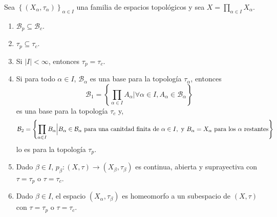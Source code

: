 \documentclass[12pt]{report}
\theoremstyle{largebreak}
\newcommand\cf[3]{\ensuremath{#1:#2\rightarrow#3}}
\begin{document}
    \begin{propo}
        Sea $\left\{(X_\alpha,\tau_\alpha) \right\}_{ \alpha\in I}$ una familia de espacios topológicos y sea $X=\prod_{\alpha\in I}X_\alpha$.
        \begin{enumerate}
            \item $\mathcal{B}_p\subseteq\mathcal{B}_c$.
            \item $\tau_p\subseteq\tau_c$.
            \item Si $|I|<\infty$, entonces $\tau_p=\tau_c$.
            \item Si para todo $\alpha\in I$, $\mathcal{B}_\alpha$ es una base para la topología $\tau_\alpha$, entonces
            \begin{equation*}
                \mathcal{B}_1=\left\{\prod_{\alpha\in I}A_\alpha\Big|\forall \alpha\in I, A_\alpha\in\mathcal{B}_\alpha \right\}
            \end{equation*}
            es una base para la topología $\tau_c$ y,
            \begin{equation*}
                \mathcal{B}_2=\left\{\prod_{\alpha\in I}B_\alpha\Big|B_\alpha\in\mathcal{B}_\alpha\textup{ para una canitdad finita de } \alpha\in I,\textup{ y }B_\alpha=X_\alpha\textup{ para los $\alpha$ restantes}  \right\}
            \end{equation*}
            lo es para la topología $\tau_p$.
            \item Dado $\beta\in I$, $\cf{p_\beta}{(X,\tau)}{(X_\beta,\tau_\beta)}$ es continua, abierta y suprayectiva con $\tau=\tau_p$ o $\tau=\tau_c$.
            \item Dado $\beta\in I$, el espacio $(X_\alpha,\tau_\beta)$ es homeomorfo a un subespacio de $(X,\tau)$ con $\tau=\tau_p$ o $\tau=\tau_c$.
        \end{enumerate}
    \end{propo}
\end{document}
